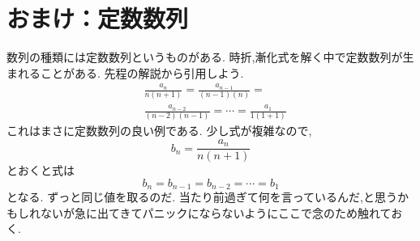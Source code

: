 
\section{おまけ：定数数列}
数列の種類には定数数列というものがある.
時折,漸化式を解く中で定数数列が生まれることがある.
先程の解説から引用しよう.
\begin{align*}
  &\frac{a_{n}}{n(n+1)}=\frac{a_{n-1}}{(n-1)(n)}=\\
  &\frac{a_{n-2}}{(n-2)(n-1)}=\cdots=\frac{a_{1}}{1(1+1)}
\end{align*}
これはまさに定数数列の良い例である.
少し式が複雑なので,
\[
  b_n=\frac{a_{n}}{n(n+1)}
\]
とおくと式は
\[
  b_n=b_{n-1}=b_{n-2}=\cdots=b_1
\]
となる.
ずっと同じ値を取るのだ.
当たり前過ぎて何を言っているんだ,と思うかもしれないが急に出てきてパニックにならないようにここで念のため触れておく.
